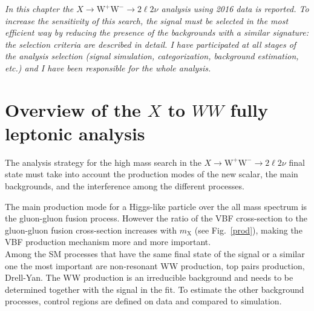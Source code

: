 
\textit{
In this chapter the $X \to \mathrm{W^+W^-}\to2\ell2\nu$ analysis using 2016 data is reported. To increase the sensitivity of this search, the signal must be selected in the most efficient way by reducing the
presence of the backgrounds with a similar signature: the selection criteria are described in detail. I have participated at all stages of the analysis selection (signal simulation, categorization, background estimation, etc.)  and I have been responsible for the whole analysis.} 

\section{Overview of the $X$ to $WW$ fully leptonic analysis }\label{sec:AnalysisStrategy_Intro}

The analysis strategy for the high mass search in the $X \to \mathrm{W^+W^-}\to2\ell2\nu$ final state must take into account the production modes of the new scalar, the main backgrounds, and the interference among the different processes. 

The main production mode for a Higgs-like particle over the all mass spectrum is the gluon-gluon fusion process. 
However the ratio of the VBF cross-section to the gluon-gluon fusion cross-section increases with $m_\mathrm{X}$ (see Fig.~\ref{prod}), making the VBF production mechanism more and more important.\\

Among the SM processes that have the same final state of the signal or a similar one the most important are non-resonant WW production, top pairs production, Drell-Yan. The WW production is an irreducible background and needs to be determined together with the signal in the fit. To estimate the other background processes, control regions are defined on data and compared to simulation. \\
 
